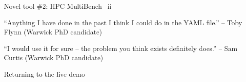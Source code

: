 \documentclass[10pt,aspectratio=169]{beamer}
\begin{document}
\begin{frame}{Novel tool \#2: HPC MultiBench \ ii}
    \vspace{0.2cm}
    \large\begin{displayquote}
        ``Anything I have done in the past I think I could do in the YAML file.''\newline
        \hspace*{0.5cm}-- Toby Flynn (Warwick PhD candidate)
    \end{displayquote}
    \vspace{1cm}
    \large\begin{displayquote}
        ``I would use it for sure -- the problem you think exists definitely does.''\newline
        \hspace*{0.5cm} -- Sam Curtis (Warwick PhD candidate)
    \end{displayquote}
\end{frame}


\begin{frame}{Returning to the live demo}

\end{frame}
\end{document}
